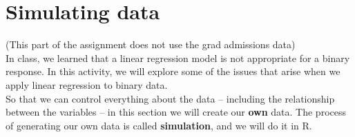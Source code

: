 \documentclass[11pt]{article}
\begin{document}
\section{Simulating data}

(This part of the assignment does not use the grad admissions data)\\

\noindent In class, we learned that a linear regression model is not appropriate for a binary response. In this activity, we will explore some of the issues that arise when we apply linear regression to binary data.\\

\noindent So that we can control everything about the data -- including the relationship between the variables -- in this section we will create our \textbf{own} data. The process of generating our own data is called \textbf{simulation}, and we will do it in R.\\
\end{document}
